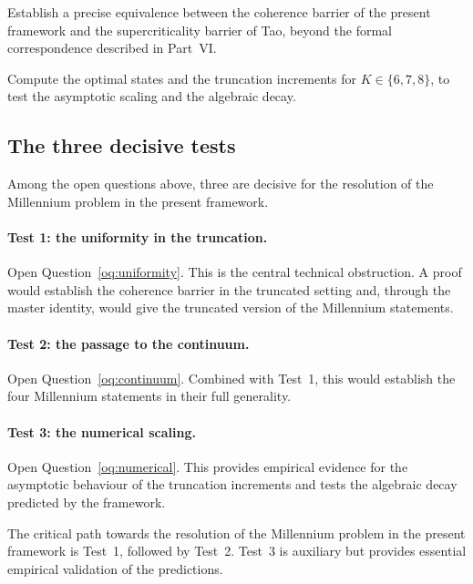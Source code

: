 \begin{openquestion}
\label{oq:Tao}
Establish a precise equivalence between the coherence barrier 
of the present framework and the supercriticality barrier of Tao, 
beyond the formal correspondence described in Part~VI.
\end{openquestion}

\begin{openquestion}
\label{oq:numerical}
Compute the optimal states and the truncation increments for 
$K\in\{6,7,8\}$, to test the asymptotic scaling and the algebraic 
decay.
\end{openquestion}

\subsection{The three decisive tests}
\label{ssec:three-tests}

Among the open questions above, three are decisive for the 
resolution of the Millennium problem in the present framework.

\paragraph{Test 1: the uniformity in the truncation.} 
Open Question~\ref{oq:uniformity}. This is the central technical 
obstruction. A proof would establish the coherence barrier in the 
truncated setting and, through the master identity, would give 
the truncated version of the Millennium statements.

\paragraph{Test 2: the passage to the continuum.}
Open Question~\ref{oq:continuum}. Combined with Test~1, this 
would establish the four Millennium statements in their full 
generality.

\paragraph{Test 3: the numerical scaling.}
Open Question~\ref{oq:numerical}. This provides empirical evidence 
for the asymptotic behaviour of the truncation increments and 
tests the algebraic decay predicted by the framework.

\begin{remark}\label{rem:critical-path}
The critical path towards the resolution of the Millennium problem 
in the present framework is Test~1, followed by Test~2. Test~3 is 
auxiliary but provides essential empirical validation of the 
predictions.
\end{remark}

